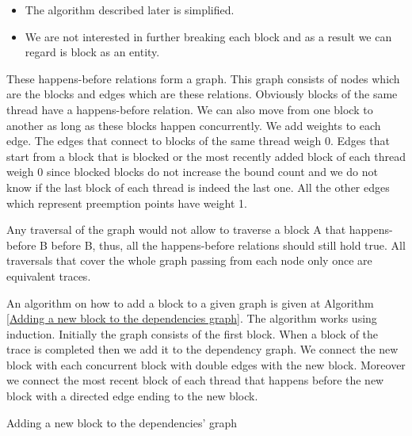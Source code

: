 \begin{itemize}
    \item The algorithm described later is simplified.
    \item We are not interested in further breaking each block and as a result we can regard is block as an entity.
\end{itemize}

These happens-before relations form a graph. This graph consists of nodes which are the blocks and edges which are these
relations. Obviously blocks of the same thread have a happens-before relation. We can also move from one block to another as long as these blocks happen
concurrently. We add weights to each edge. The edges that connect to blocks of the same thread weigh 0. Edges that start from a block that 
is blocked or the most recently added block of each thread weigh 0 since blocked blocks do not increase the bound count and we do not know if the last block of
each thread is indeed the last one. All the other edges which represent preemption points have weight 1.


Any traversal of the graph would not allow to traverse a block A that happens-before B before B, thus, all the happens-before relations should still hold true.
All traversals that cover the whole graph passing from each node only once are equivalent traces.

\noindent An algorithm on how to add a block to a given graph is given at Algorithm \ref{Adding a new block to the dependencies graph}. 
The algorithm works using induction.
Initially the graph consists of the first block. When a block of the trace is completed then we add it to the dependency graph. We connect the new block with each 
concurrent block with double edges with the new block. Moreover we connect the most recent block of each thread that happens before the new block with a directed edge
ending to the new block. 

\begin{algorithm}[H]
    \caption{Adding a new block to the dependencies' graph}
    \label{Adding a new block to the dependencies graph}
\end{algorithm}


